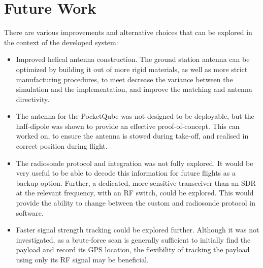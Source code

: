 \section{Future Work}

There are various improvements and alternative choices that can be explored in the context of the developed system:
\begin{itemize}
    \item Improved helical antenna construction. The ground station antenna can be optimized by building it out of more rigid materials, as well as more strict manufacturing procedures, to meet decrease the variance between the simulation and the implementation, and improve the matching and antenna directivity.
    \item The antenna for the PocketQube was not designed to be deployable, but the half-dipole was shown to provide an effective proof-of-concept. This can worked on, to ensure the antenna is stowed during take-off, and realised in correct position during flight.
    \item The radiosonde protocol and integration was not fully explored. It would be very useful to be able to decode this information for future flights as a backup option. Further, a dedicated, more sensitive transceiver than an SDR at the relevant frequency, with an RF switch, could be explored. This would provide the ability to change between the custom and radiosonde protocol in software.
    \item Faster signal strength tracking could be explored further. Although it was not investigated, as a brute-force scan is generally sufficient to initially find the payload and record its GPS location, the flexibility of tracking the payload using only its RF signal may be beneficial.
\end{itemize}